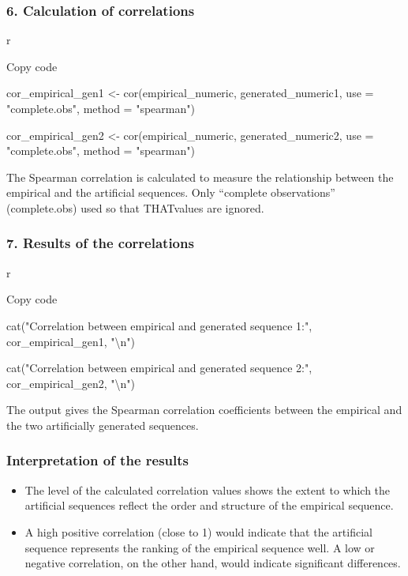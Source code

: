 \documentclass[
]{article}
\begin{document}
\subsubsection{\texorpdfstring{\textbf{6. Calculation of
correlations}}{6. Calculation of correlations}}\label{calculation-of-correlations}

r

Copy code

cor\_empirical\_gen1 \textless- cor(empirical\_numeric,
generated\_numeric1, use = "complete.obs", method = "spearman")

cor\_empirical\_gen2 \textless- cor(empirical\_numeric,
generated\_numeric2, use = "complete.obs", method = "spearman")

The Spearman correlation is calculated to measure the relationship
between the empirical and the artificial sequences. Only ``complete
observations'' (complete.obs) used so that THATvalues
\hspace{0pt}\hspace{0pt}are ignored.

\subsubsection{\texorpdfstring{\textbf{7. Results of the
correlations}}{7. Results of the correlations}}\label{results-of-the-correlations}

r

Copy code

cat("Correlation between empirical and generated sequence 1:",
cor\_empirical\_gen1, "\textbackslash n")

cat("Correlation between empirical and generated sequence 2:",
cor\_empirical\_gen2, "\textbackslash n")

The output gives the Spearman correlation coefficients between the
empirical and the two artificially generated sequences.

\subsubsection{\texorpdfstring{\textbf{Interpretation of the
results}}{Interpretation of the results}}\label{interpretation-of-the-results}

\begin{itemize}
\item
  The level of the calculated correlation values
  \hspace{0pt}\hspace{0pt}shows the extent to which the artificial
  sequences reflect the order and structure of the empirical sequence.
\item
  A high positive correlation (close to 1) would indicate that the
  artificial sequence represents the ranking of the empirical sequence
  well. A low or negative correlation, on the other hand, would indicate
  significant differences.
\end{itemize}
\end{document}
